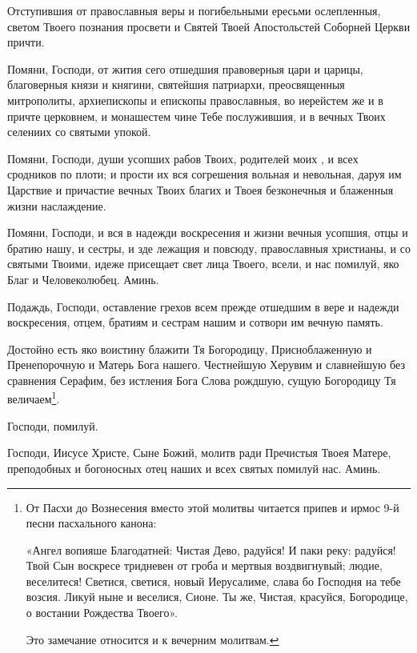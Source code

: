 \begin{mymulticols}
Отступившия от православныя веры и погибельными ересьми ослепленныя, светом Твоего познания просвети и Святей Твоей Апостольстей Соборней Церкви причти. 


Помяни, Господи, от жития сего отшедшия правоверныя цари и царицы, благоверныя князи и княгини, святейшия патриархи, преосвященныя митрополиты, архиепископы и епископы православныя, во иерейстем же и в причте церковнем, и монашестем чине Тебе послужившия, и в вечных Твоих селениих со святыми упокой. 

Помяни, Господи, души усопших рабов Твоих, родителей моих , и всех сродников по плоти; и прости их вся согрешения вольная и невольная, даруя им Царствие и причастие вечных Твоих благих и Твоея безконечныя и блаженныя жизни наслаждение. 

Помяни, Господи, и вся в надежди воскресения и жизни вечныя усопшия, отцы и братию нашу, и сестры, и зде лежащия и повсюду, православныя христианы, и со святыми Твоими, идеже присещает свет лица Твоего, всели, и нас помилуй, яко Благ и Человеколюбец. Аминь. 

Подаждь, Господи, оставление грехов всем прежде отшедшим в вере и надежди воскресения, отцем, братиям и сестрам нашим и сотвори им вечную память. 


Достойно есть яко воистину блажити Тя Богородицу, Присноблаженную и Пренепорочную и Матерь Бога нашего. Честнейшую Херувим и славнейшую без сравнения Серафим, без истления Бога Слова рождшую, сущую Богородицу Тя величаем\footnote{От Пасхи до Вознесения вместо этой молитвы читается припев и ирмос 9-й песни пасхального канона:

«Ангел вопияше Благодатней: Чистая Дево, радуйся! И паки реку: радуйся! Твой Сын воскресе тридневен от гроба и мертвыя воздвигнувый; людие, веселитеся! Светися, светися, новый Иерусалиме, слава бо Господня на тебе возсия. Ликуй ныне и веселися, Сионе. Ты же, Чистая, красуйся, Богородице, о востании Рождества Твоего».

Это замечание относится и к вечерним молитвам. }.

\slavainynen

 Господи, помилуй. 

Господи, Иисусе Христе, Сыне Божий, молитв ради Пречистыя Твоея Матере, преподобных и богоносных отец наших и всех святых помилуй нас. Аминь.

\end{mymulticols}

